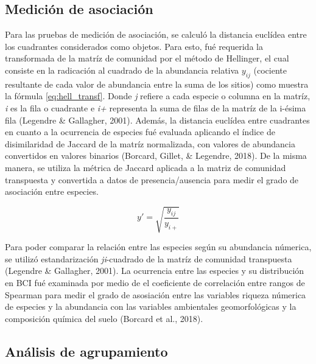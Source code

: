 \documentclass[11pt,]{article}
\begin{document}
\subsection{Medición de asociación}\label{mediciuxf3n-de-asociaciuxf3n}

Para las pruebas de medición de asociación, se calculó la distancia
euclídea entre los cuadrantes considerados como objetos. Para esto, fué
requerida la transformada de la matríz de comunidad por el método de
Hellinger, el cual consiste en la radicación al cuadrado de la
abundancia relativa \(y_{ij}\) (cociente resultante de cada valor de
abundancia entre la suma de los sitios) como muestra la fórmula
\ref{eq:hell_transf}. Donde \emph{j} refiere a cada especie o columna en
la matríz, \emph{i} es la fila o cuadrante e \emph{i+} representa la
suma de filas de la matríz de la i-ésima fila (Legendre \& Gallagher,
2001). Además, la distancia euclídea entre cuadrantes en cuanto a la
ocurrencia de especies fué evaluada aplicando el índice de disimilaridad
de Jaccard de la matríz normalizada, con valores de abundancia
convertidos en valores binarios (Borcard, Gillet, \& Legendre, 2018). De
la misma manera, se utiliza la métrica de Jaccard aplicada a la matriz
de comunidad transpuesta y convertida a datos de presencia/ausencia para
medir el grado de asociación entre especies.

\begin{equation} \label{eq:hell_transf}
y' = \sqrt{\frac{y_{ij}}{y_{i+}}}
\end{equation}

Para poder comparar la relación entre las especies según su abundancia
númerica, se utilizó estandarización \emph{ji}-cuadrado de la matríz de
comunidad transpuesta (Legendre \& Gallagher, 2001). La ocurrencia entre
las especies y su distribución en BCI fué examinada por medio de el
coeficiente de correlación entre rangos de Spearman para medir el grado
de asosiación entre las variables riqueza númerica de especies y la
abundancia con las variables ambientales geomorfológicas y la
composición química del suelo (Borcard et al., 2018).

\subsection{Análisis de agrupamiento}\label{anuxe1lisis-de-agrupamiento}
\end{document}
